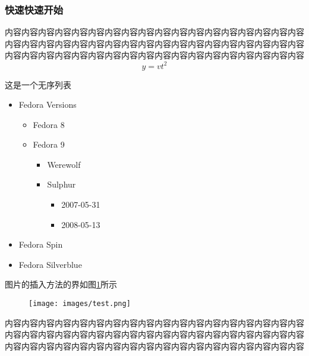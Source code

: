 \documentclass{bjfu}
\begin{document}
\subsubsection{快速快速开始}

内容内容内容内容内容内容内容内容内容内容内容内容内容内容内容内容内容内容内容内容内容内容内容内容内容内容内容内容内容内容内容内容内容内容内容内容内容内容内容内容内容内容内容内容内容内容内容内容内容内容内容内容内容内容
\begin{equation}
    y=vt^2
\end{equation}


这是一个无序列表
\begin{itemize}
    \item Fedora Versions
    \begin{itemize}
        \item Fedora 8
        \item Fedora 9
        \begin{itemize}
            \item Werewolf
            \item Sulphur
            \begin{itemize}
                \item 2007-05-31
                \item 2008-05-13
            \end{itemize}
        \end{itemize}
    \end{itemize}
    \item Fedora Spin
    \item Fedora Silverblue
\end{itemize}

图片的插入方法的界如图\ref{Fig:test}所示
\begin{figure}[htbp] %
    \centering %
    \texttt{[image: images/test.png]} %
    \label{Fig:test} %
\end{figure}

内容内容内容内容内容内容内容内容内容内容内容内容内容内容内容内容内容内容内容内容内容内容内容内容内容内容内容内容内容内容内容内容内容内容内容内容内容内容内容内容内容内容内容内容内容内容内容内容内容内容内容内容内容内容
\end{document}
